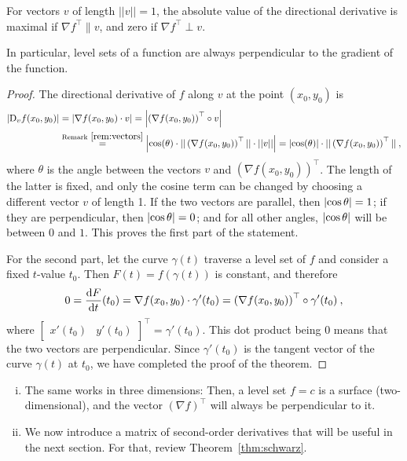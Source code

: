 \begin{theorem}
\label{thm:geom_dd}
For vectors $v$ of length $||v||=1$, the absolute value of the directional derivative is maximal if $\nabla f ^\top \parallel v$, and zero if $\nabla f ^\top \perp v.$

In particular, level sets of a function are always perpendicular to the gradient of the function.
\end{theorem}
\begin{proof}
The directional derivative of $f$ along $v$ at the point $(x_0,y_0)$ is
\begin{equation*}
\begin{split}
\left| \mathrm{D}_v f(x_0,y_0)  \right|
& = \left|  \nabla f (x_0,y_0) \cdot v \right| 
  = \left|  \left( \nabla f (x_0,y_0) \right)^\top \circ v \right| \\
& \stackrel{\text{Remark}~\ref{rem:vectors}}{=}
 \left|  \cos(\theta) \cdot || \left(\nabla f (x_0,y_0) \right)^\top || \cdot || v || \right| 
  = \left|  \cos(\theta)  \right| \cdot || \left( \nabla f (x_0,y_0) \right)^\top || \:,
\end{split}
\end{equation*}
where $\theta$ is the angle between the vectors $v$ and $\left( \nabla f (x_0,y_0) \right)^\top$. The length of the latter is fixed, and only the cosine term can be changed by choosing a different vector $v$ of length 1. If the two vectors are parallel, then $\left| \cos \theta \right| = 1$; if they are perpendicular, then $\left| \cos \theta \right| = 0$; and for all other angles, $\left| \cos \theta \right|$ will be between $0$ and $1$. This proves the first part of the statement.

For the second part, let the curve $\gamma(t)$ traverse a level set of $f$ and consider a fixed $t$-value $t_0$. Then $F(t)=f(\gamma(t))$ is constant, and therefore
\[ 0 = \displaystyle{\frac{\mathrm{d}F}{\mathrm{d}t}} (t_0) = \nabla f (x_0,y_0) \cdot \gamma'(t_0) = \left( \nabla f (x_0,y_0) \right)^\top \circ \gamma'(t_0) \:, \]
where $ \begin{bmatrix}
x'(t_0) & y'(t_0)
\end{bmatrix}^\top = \gamma'(t_0)$. This dot product being $0$ means that the two vectors are perpendicular. Since $\gamma'(t_0)$ is the tangent vector of the curve $\gamma(t)$ at $t_0$, we have completed the proof of the theorem.
\end{proof}

\begin{remark}
\begin{enumerate}[(i)]
	\item The same works in three dimensions: Then, a level set $f=c$ is a surface (two-dimensional), and the vector $\left(\nabla f\right)^\top$ will always be perpendicular to it.
	\item We now introduce a matrix of second-order derivatives that will be useful in the next section. For that, review Theorem~\ref{thm:schwarz}.
\end{enumerate}
\end{remark}

